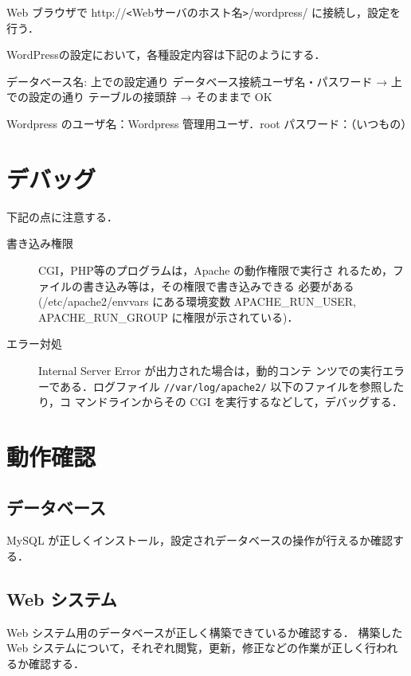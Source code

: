 Web ブラウザで http://\verb+<+Webサーバのホスト名\verb+>+/wordpress/ に接続し，設定を行う．

WordPressの設定において，各種設定内容は下記のようにする．

\begin{cli}
データベース名: 上での設定通り
データベース接続ユーザ名・パスワード
  → 上での設定の通り
テーブルの接頭辞 → そのままで OK

Wordpress のユーザ名：Wordpress 管理用ユーザ．root
            パスワード：（いつもの）
\end{cli}


\section{デバッグ}

下記の点に注意する．

\begin{description}
\item[書き込み権限] CGI，PHP等のプログラムは，Apache の動作権限で実行さ
	    れるため，ファイルの書き込み等は，その権限で書き込みできる
	    必要がある(/etc/apache2/envvars にある環境変数
	    APACHE\_RUN\_USER, APACHE\_RUN\_GROUP に権限が示されている)．
 \item[エラー対処] Internal Server Error が出力された場合は，動的コンテ
	    ンツでの実行エラーである．ログファイル
	    \texttt{//var/log/apache2/} 以下のファイルを参照したり，コ
	    マンドラインからその CGI を実行するなどして，デバッグする．
\end{description}


\clearpage
\section{動作確認}

\subsection*{データベース}
MySQL が正しくインストール，設定されデータベースの操作が行えるか確認する．

%

\subsection*{Web システム}
Web システム用のデータベースが正しく構築できているか確認する．
構築した Web システムについて，それぞれ閲覧，更新，修正などの作業が正しく行われるか確認する．

